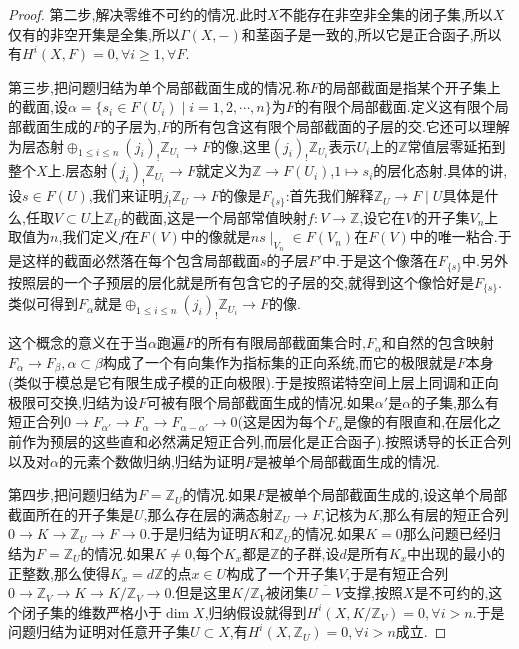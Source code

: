 \begin{enumerate}
\begin{proof}
		\qquad
		
		第二步,解决零维不可约的情况.此时$X$不能存在非空非全集的闭子集,所以$X$仅有的非空开集是全集,所以$\Gamma(X,-)$和茎函子是一致的,所以它是正合函子,所以有$H^i(X,F)=0,\forall i\ge1,\forall F$.
		
		\qquad
		
		第三步,把问题归结为单个局部截面生成的情况.称$F$的局部截面是指某个开子集上的截面,设$\alpha=\{s_i\in F(U_i)\mid i=1,2,\cdots,n\}$为$F$的有限个局部截面.定义这有限个局部截面生成的$F$的子层为,$F$的所有包含这有限个局部截面的子层的交.它还可以理解为层态射$\oplus_{1\le i\le n}(j_i)_!\mathbb{Z}_{U_i}\to F$的像,这里$(j_i)_!\mathbb{Z}_{U_i}$表示$U_i$上的$\mathbb{Z}$常值层零延拓到整个$X$上.层态射$(j_i)_!\mathbb{Z}_{U_i}\to F$就定义为$\mathbb{Z}\to F(U_i)$,$1\mapsto s_i$的层化态射.具体的讲,设$s\in F(U)$,我们来证明$j_!\mathbb{Z}_U\to F$的像是$F_{\{s\}}$:首先我们解释$\mathbb{Z}_U\to F\mid U$具体是什么,任取$V\subset U$上$\mathbb{Z}_U$的截面,这是一个局部常值映射$f:V\to\mathbb{Z}$,设它在$V$的开子集$V_n$上取值为$n$,我们定义$f$在$F(V)$中的像就是$ns\mid_{V_n}\in F(V_n)$在$F(V)$中的唯一粘合.于是这样的截面必然落在每个包含局部截面$s$的子层$F'$中.于是这个像落在$F_{\{s\}}$中.另外按照层的一个子预层的层化就是所有包含它的子层的交,就得到这个像恰好是$F_{\{s\}}$.类似可得到$F_{\alpha}$就是$\oplus_{1\le i\le n}(j_i)_!\mathbb{Z}_{U_i}\to F$的像.
		
		\qquad
		
		这个概念的意义在于当$\alpha$跑遍$F$的所有有限局部截面集合时,$F_{\alpha}$和自然的包含映射$F_{\alpha}\to F_{\beta},\alpha\subset\beta$构成了一个有向集作为指标集的正向系统,而它的极限就是$F$本身(类似于模总是它有限生成子模的正向极限).于是按照诺特空间上层上同调和正向极限可交换,归结为设$F$可被有限个局部截面生成的情况.如果$\alpha'$是$\alpha$的子集,那么有短正合列$0\to F_{\alpha'}\to F_{\alpha}\to F_{\alpha-\alpha'}\to0$(这是因为每个$F_{\alpha}$是像的有限直和,在层化之前作为预层的这些直和必然满足短正合列,而层化是正合函子).按照诱导的长正合列以及对$\alpha$的元素个数做归纳,归结为证明$F$是被单个局部截面生成的情况.
		
		\qquad
		
		第四步,把问题归结为$F=\mathbb{Z}_U$的情况.如果$F$是被单个局部截面生成的,设这单个局部截面所在的开子集是$U$,那么存在层的满态射$\mathbb{Z}_U\to F$,记核为$K$,那么有层的短正合列$0\to K\to\mathbb{Z}_U\to F\to0$.于是归结为证明$K$和$\mathbb{Z}_U$的情况.如果$K=0$那么问题已经归结为$F=\mathbb{Z}_U$的情况.如果$K\not=0$,每个$K_x$都是$\mathbb{Z}$的子群,设$d$是所有$K_x$中出现的最小的正整数,那么使得$K_x=d\mathbb{Z}$的点$x\in U$构成了一个开子集$V$,于是有短正合列$0\to\mathbb{Z}_V\to K\to K/\mathbb{Z}_V\to0$.但是这里$K/\mathbb{Z}_V$被闭集$\overline{U-V}$支撑,按照$X$是不可约的,这个闭子集的维数严格小于$\dim X$,归纳假设就得到$H^i(X,K/\mathbb{Z}_V)=0,\forall i>n$.于是问题归结为证明对任意开子集$U\subset X$,有$H^i(X,\mathbb{Z}_U)=0,\forall i>n$成立.
		

\end{proof}
\end{enumerate}
